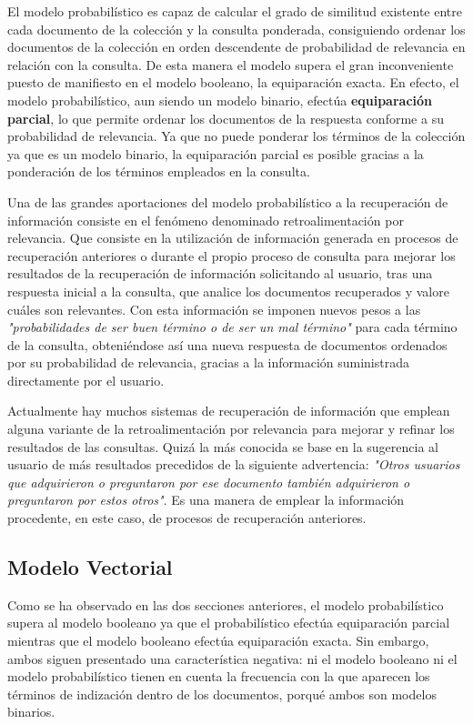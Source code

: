 \documentclass{article}
\begin{document}
El modelo probabilístico es capaz de calcular el grado de similitud existente entre cada documento de la colección y la consulta ponderada, consiguiendo ordenar los documentos de la colección en orden descendente de probabilidad de relevancia en relación con la consulta. De esta manera el modelo supera el gran inconveniente puesto de manifiesto en el modelo booleano, la equiparación exacta. En efecto, el modelo probabilístico, aun siendo un modelo binario, efectúa \textbf{equiparación parcial}, lo que permite ordenar los documentos de la respuesta conforme a su probabilidad de relevancia. Ya que no puede ponderar los términos de la colección ya que es un modelo binario, la equiparación parcial es posible gracias a la ponderación de los términos empleados en la consulta.

Una de las grandes aportaciones del modelo probabilístico a la recuperación de información consiste en el fenómeno denominado retroalimentación por relevancia. Que consiste en la utilización de información generada en procesos de recuperación anteriores o durante el propio proceso de consulta para mejorar los resultados de la recuperación de información solicitando al usuario, tras una respuesta inicial a la consulta, que analice los documentos recuperados y valore cuáles son relevantes. Con esta información se imponen nuevos pesos a las \textit{"probabilidades de ser buen término o de ser un mal término"} para cada término de la consulta, obteniéndose así una nueva respuesta de documentos ordenados por su probabilidad de relevancia, gracias a la información suministrada directamente por el usuario.

Actualmente hay muchos sistemas de recuperación de información que emplean alguna variante de la retroalimentación por relevancia para mejorar y refinar los resultados de las consultas. Quizá la más conocida se base en la sugerencia al usuario de más resultados precedidos de la siguiente advertencia: \textit{"Otros usuarios que adquirieron o preguntaron por ese documento también adquirieron o preguntaron por estos otros"}. Es una manera de emplear la información procedente, en este caso, de procesos de recuperación anteriores.

\subsection{Modelo Vectorial}

Como se ha observado en las dos secciones anteriores, el modelo probabilístico supera al modelo booleano ya que el probabilístico efectúa equiparación parcial mientras que el modelo booleano efectúa equiparación exacta. Sin embargo, ambos siguen presentado una característica negativa: ni el modelo booleano ni el modelo probabilístico tienen en cuenta la frecuencia con la que aparecen los términos de indización dentro de los documentos, porqué ambos son modelos binarios.
\end{document}
